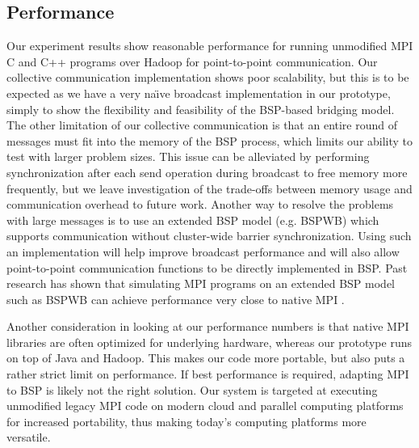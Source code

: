 \documentclass[conference,10pt] {IEEEtran}
\begin{document}
\subsection{Performance}
Our experiment results show reasonable performance for running unmodified MPI 
C and C++ programs over Hadoop for point-to-point communication. Our collective 
communication implementation shows poor scalability, but this is to be expected 
as we have a very na\"{\i}ve broadcast implementation in our prototype, simply 
to show the flexibility and feasibility of the BSP-based bridging model.  The other limitation of our 
collective communication is that an entire round of messages must fit into the 
memory of the BSP process, which limits our ability to test with larger problem 
sizes. This issue can be alleviated by performing synchronization after each send 
operation during broadcast to free memory more frequently, but we leave investigation of the 
trade-offs between memory usage and communication overhead to future work. 
Another way to resolve the problems with large messages is to use 
an extended BSP model (e.g. BSPWB) which supports communication without 
cluster-wide barrier synchronization. Using such an implementation will help improve broadcast
performance and will also allow point-to-point communication functions to be directly
implemented in BSP. Past research has shown that simulating MPI programs on an
extended BSP model such as BSPWB can achieve performance very close to native
MPI \cite{Roda:1998:BSP:945406.938371}.

Another consideration in looking at our performance
numbers is that native MPI libraries are often optimized for underlying hardware,
whereas our prototype runs on top of Java and Hadoop. This
makes our code more portable, but also puts a rather strict limit
on performance. If best performance is required,
adapting MPI to BSP is likely not the right solution.
Our system is targeted at executing unmodified legacy
MPI code on modern cloud and parallel computing platforms for
increased portability, thus making today's computing platforms more versatile.
\end{document}
